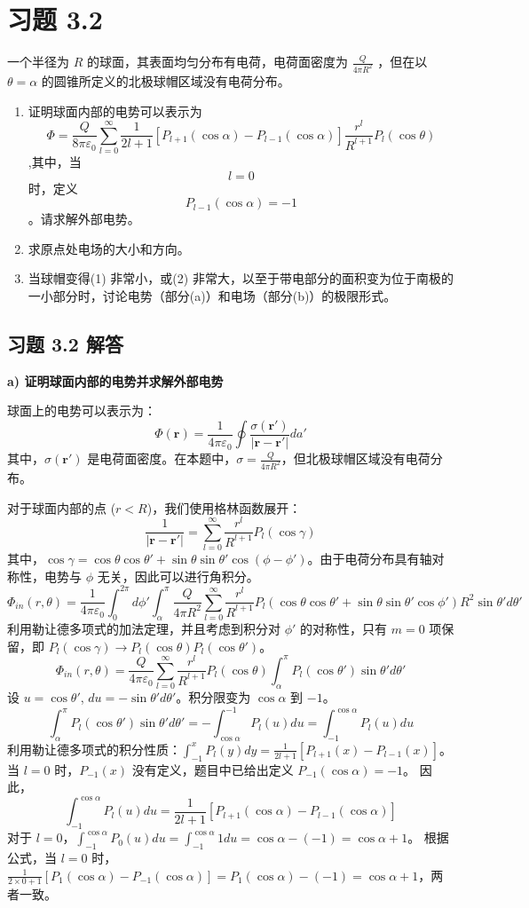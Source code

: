 
\section{习题 3.2}
一个半径为  $R$  的球面，其表面均匀分布有电荷，电荷面密度为  $\frac{Q}{4\pi R^2}$ ，但在以 $\theta = \alpha$ 的圆锥所定义的北极球帽区域没有电荷分布。
\begin{enumerate}
    \item 证明球面内部的电势可以表示为\[\Phi = \frac{Q}{8\pi \varepsilon_0} \sum_{l=0}^\infty \frac{1}{2l+1} \left[ P_{l+1}(\cos\alpha) - P_{l-1}(\cos\alpha) \right] \frac{r^l}{R^{l+1}} P_l(\cos\theta)\],其中，当  \[l = 0\]  时，定义  \[P_{l-1}(\cos\alpha) = -1\]。请求解外部电势。
    \item 求原点处电场的大小和方向。
    \item 当球帽变得(1) 非常小，或(2) 非常大，以至于带电部分的面积变为位于南极的一小部分时，讨论电势（部分(a)）和电场（部分(b)）的极限形式。
\end{enumerate}

\subsection*{习题 3.2 解答}

\textbf{a) 证明球面内部的电势并求解外部电势}

球面上的电势可以表示为：
\[ \Phi(\mathbf{r}) = \frac{1}{4\pi \varepsilon_0} \oint \frac{\sigma(\mathbf{r}')}{|\mathbf{r} - \mathbf{r}'|} da' \]
其中，$\sigma(\mathbf{r}')$ 是电荷面密度。在本题中，$\sigma = \frac{Q}{4\pi R^2}$，但北极球帽区域没有电荷分布。

对于球面内部的点 ($r < R$)，我们使用格林函数展开：
\[ \frac{1}{|\mathbf{r} - \mathbf{r}'|} = \sum_{l=0}^\infty \frac{r^l}{R^{l+1}} P_l(\cos\gamma) \]
其中，$\cos\gamma = \cos\theta \cos\theta' + \sin\theta \sin\theta' \cos(\phi - \phi')$。由于电荷分布具有轴对称性，电势与 $\phi$ 无关，因此可以进行角积分。
\[ \Phi_{in}(r, \theta) = \frac{1}{4\pi \varepsilon_0} \int_0^{2\pi} d\phi' \int_{\alpha}^{\pi} \frac{Q}{4\pi R^2} \sum_{l=0}^\infty \frac{r^l}{R^{l+1}} P_l(\cos\theta \cos\theta' + \sin\theta \sin\theta' \cos\phi') R^2 \sin\theta' d\theta' \]
利用勒让德多项式的加法定理，并且考虑到积分对 $\phi'$ 的对称性，只有 $m=0$ 项保留，即 $P_l(\cos\gamma) \rightarrow P_l(\cos\theta) P_l(\cos\theta')$。
\[ \Phi_{in}(r, \theta) = \frac{Q}{4\pi \varepsilon_0} \sum_{l=0}^\infty \frac{r^l}{R^{l+1}} P_l(\cos\theta) \int_{\alpha}^{\pi} P_l(\cos\theta') \sin\theta' d\theta' \]
设 $u = \cos\theta'$, $du = -\sin\theta' d\theta'$。积分限变为 $\cos\alpha$ 到 $-1$。
\[ \int_{\alpha}^{\pi} P_l(\cos\theta') \sin\theta' d\theta' = -\int_{\cos\alpha}^{-1} P_l(u) du = \int_{-1}^{\cos\alpha} P_l(u) du \]
利用勒让德多项式的积分性质：$\int_{-1}^{x} P_l(y) dy = \frac{1}{2l+1} [P_{l+1}(x) - P_{l-1}(x)]$。当 $l=0$ 时，$P_{-1}(x)$ 没有定义，题目中已给出定义 $P_{-1}(\cos\alpha) = -1$。
因此，
\[ \int_{-1}^{\cos\alpha} P_l(u) du = \frac{1}{2l+1} [P_{l+1}(\cos\alpha) - P_{l-1}(\cos\alpha)] \]
对于 $l=0$，$\int_{-1}^{\cos\alpha} P_0(u) du = \int_{-1}^{\cos\alpha} 1 du = \cos\alpha - (-1) = \cos\alpha + 1$。
根据公式，当 $l=0$ 时，$\frac{1}{2\times 0 + 1} [P_{1}(\cos\alpha) - P_{-1}(\cos\alpha)] = P_1(\cos\alpha) - (-1) = \cos\alpha + 1$，两者一致。

